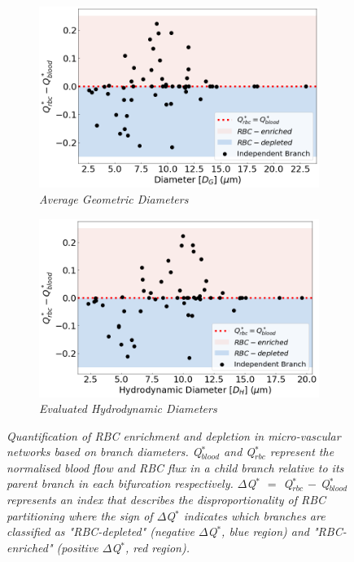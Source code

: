 \begin{figure}[H]
\centering
\begin{subfigure}{0.48 \textwidth}
    \includegraphics[width=1\textwidth]{images/DisproportionalityIndexDG.png}
    \caption{\textit{Average Geometric Diameters} \label{DisproportionalityIndexDG}}
\end{subfigure}
\hfill
\begin{subfigure}{0.48 \textwidth}
    \includegraphics[width=1\textwidth]{images/DisproportionalityIndexDH.png}
    \caption{\textit{Evaluated Hydrodynamic Diameters} \label{DisproportionalityIndexDH}}
\end{subfigure}
\caption{\textit{Quantification of RBC enrichment and depletion in micro-vascular networks based on branch diameters. Q$^{*}_{blood}$ and Q$^{*}_{rbc}$ represent the normalised blood flow and RBC flux in a child branch relative to its parent branch in each bifurcation respectively. $\Delta$Q$^{*}$ $=$ Q$^{*}_{rbc}$ $-$ Q$^{*}_{blood}$ represents an index that describes the disproportionality of RBC partitioning where the sign of $\Delta$Q$^{*}$ indicates which branches are classified as "RBC-depleted" (negative $\Delta$Q$^{*}$, blue region) and "RBC-enriched" (positive $\Delta$Q$^{*}$, red region).} \label{DisproportionalityIndexDs}}
\end{figure}

